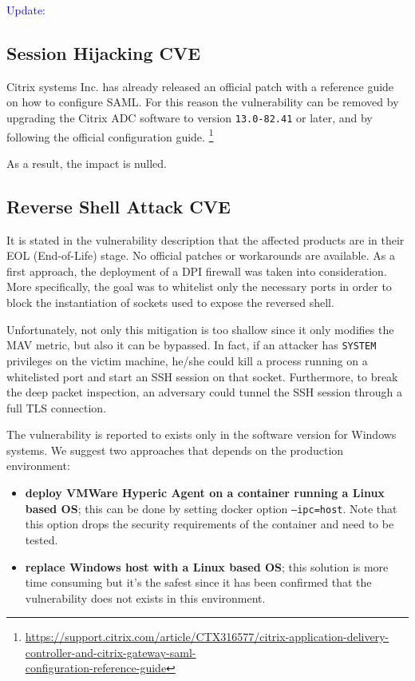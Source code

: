 \noindent \textcolor{blue}{Update:}

\subsection*{Session Hijacking \- CVE}

Citrix systems Inc. has already released an official patch with a reference guide on how to configure SAML. For this reason the vulnerability can be removed by upgrading the Citrix ADC software to version \texttt{13.0-82.41} or later, and by following the official configuration guide. \footnote{\href{https://support.citrix.com/article/CTX316577/citrix-application-delivery-controller-and-citrix-gateway-saml-configuration-reference-guide} {https://support.citrix.com/article/CTX316577/citrix-application-delivery-controller-and-citrix-gateway-saml-\\configuration-reference-guide}}

As a result, the impact is nulled.

\subsection*{Reverse Shell Attack \- CVE}

It is stated in the vulnerability description that the affected products are in their EOL (End-of-Life) stage. No official patches or workarounds are available. As a first approach, the deployment of a DPI firewall was taken into consideration. More specifically, the goal was to whitelist only the necessary ports in order to block the instantiation of sockets used to expose the reversed shell. 

Unfortunately, not only this mitigation is too shallow since it only modifies the MAV metric, but also it can be bypassed. In fact, if an attacker has \texttt{SYSTEM} privileges on the victim machine, he/she could kill a process running on a whitelisted port and start an SSH session on that socket. Furthermore, to break the deep packet inspection, an adversary could tunnel the SSH session through a full TLS connection.\cite{online:SSH-TLS}

The vulnerability is reported to exists only in the software version for Windows systems. We suggest two approaches that depends on the production environment:

\begin{itemize}
    \item \textbf{deploy VMWare Hyperic Agent on a container running a Linux based OS}; this can be done by setting docker option \texttt{--ipc=host}. Note that this option drops the security requirements of the container and need to be tested.
    \item \textbf{replace Windows host with a Linux based OS}; this solution is more time consuming but it's the safest since it has been confirmed that the vulnerability does not exists in this environment.
\end{itemize}

